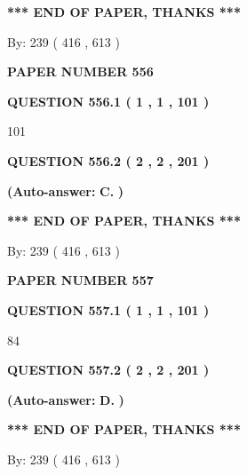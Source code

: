 \documentclass{ctexart}
\begin{document}
 
   
   
   
   
\vspace{1.0in} 
{\textbf{\large{ *** END OF PAPER, THANKS *** }}} 
   
   
\hspace{1.0in} By: 
 239 ( 416 ,  613 )
   
   
   
   
\newpage 
\setcounter{page}{ 
   556001 } 
   
   
 {\textbf{ \Large{ PAPER NUMBER  556  }}}
   
   
   
   
  
  
{\textbf{\large{QUESTION
556.1 
 ( 1 , 1 , 101 )
}}}

101
  
  
{\textbf{\large{QUESTION
556.2 
 ( 2 , 2 , 201 )
}}}
 
 
{\textbf{(Auto-answer:}}
{\textbf{\large{
C.}}}
{\textbf{)}}
 
 
   
   
   
   
\vspace{1.0in} 
{\textbf{\large{ *** END OF PAPER, THANKS *** }}} 
   
   
\hspace{1.0in} By: 
 239 ( 416 ,  613 )
   
   
   
   
\newpage 
\setcounter{page}{ 
   557001 } 
   
   
 {\textbf{ \Large{ PAPER NUMBER  557  }}}
   
   
   
   
  
  
{\textbf{\large{QUESTION
557.1 
 ( 1 , 1 , 101 )
}}}

84
  
  
{\textbf{\large{QUESTION
557.2 
 ( 2 , 2 , 201 )
}}}
 
 
{\textbf{(Auto-answer:}}
{\textbf{\large{
D.}}}
{\textbf{)}}
 
 
   
   
   
   
\vspace{1.0in} 
{\textbf{\large{ *** END OF PAPER, THANKS *** }}} 
   
   
\hspace{1.0in} By: 
 239 ( 416 ,  613 )
   
   
   
   
\newpage 
\setcounter{page}{ 
   558001 } 
   
\end{document}
